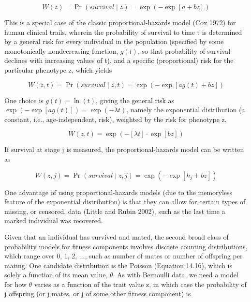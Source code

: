 \documentclass{article}
\begin{document}
\begin{equation}
W(z)=\Pr(survival\mid z)=\exp(-\exp[a+bz])
\tag{29.37}
\label{eq:29_37}
\end{equation}

This is a special case of the classic proportional-hazards model (Cox 1972) for human clinical trails, wherein the probability of survival to time t is determined by a general risk for every individual in the population (specified by some monotonically nondecreasing function,  $ g(t) $, so that probability of survival declines with increasing values of t), and a specific (proportional) risk for the particular phenotype z, which yields

\begin{equation}
W(z,t)=\Pr(survival\mid z,t)=\exp(-\exp[ag(t)+bz])
\tag{29.38a}
\label{eq:29_38a}
\end{equation}

One choice is  $ g(t) = \ln(t) $, giving the general risk as  $ \exp(-\exp[ag(t)]) = \exp(-\lambda t) $, namely the exponential distribution (a constant, i.e., age-independent, risk), weighted by the risk for phenotype z,

\begin{equation}
W(z,t)=\exp\left(-\left[\lambda t\right]\cdot\exp[b z]\right)
\tag{29.38b}
\label{eq:29_38b}
\end{equation}

If survival at stage j is measured, the proportional-hazards model can be written as

\begin{equation}
W(z,j)=\Pr(survival\mid z,j)=\exp(-\exp[h_{j}+bz])
\tag{29.38c}
\label{eq:29_38c}
\end{equation}

One advantage of using proportional-hazards models (due to the memoryless feature of the exponential distribution) is that they can allow for certain types of missing, or censored, data (Little and Rubin 2002), such as the last time a marked individual was recovered.

Given that an individual has survived and mated, the second broad class of probability models for fitness components involves discrete counting distributions, which range over 0, 1, 2, ..., such as number of mates or number of offspring per mating. One candidate distribution is the Poisson (Equation 14.16), which is solely a function of its mean value,  $ \theta $. As with Bernoulli data, we need a model for how  $ \theta $ varies as a function of the trait value z, in which case the probability of j offspring (or j mates, or j of some other fitness component) is
\end{document}
